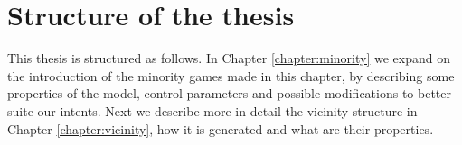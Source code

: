 \section{Structure of the thesis}

This thesis is structured as follows.
In Chapter \ref{chapter:minority} we expand on the introduction of the minority games made in this chapter, by describing some properties of the model, control parameters and possible modifications to better suite our intents. 
Next we describe more in detail the vicinity structure in Chapter \ref{chapter:vicinity}, how it is generated and what are their properties.